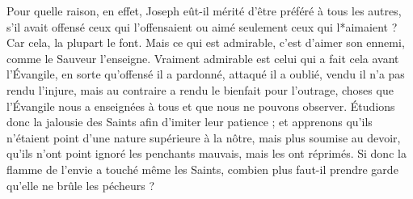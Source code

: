  Pour quelle raison, en effet, Joseph eût-il mérité d’être préféré à tous les autres, s’il avait offensé ceux qui l’offensaient ou aimé seulement ceux qui l*aimaient ? Car cela, la plupart le font. Mais ce qui est admirable, c’est d’aimer son ennemi, comme le Sauveur l’enseigne. Vraiment admirable est celui qui a fait cela avant l’Évangile, en sorte qu’offensé il a pardonné, attaqué il a oublié, vendu il n’a pas rendu l'injure, mais au contraire a rendu le bienfait pour l'outrage, choses que l’Évangile nous a enseignées à tous et que nous ne pouvons observer. Étudions donc la jalousie des Saints afin d’imiter leur patience ; et apprenons qu'ils n’étaient point d’une nature supérieure à la nôtre, mais plus soumise au devoir, qu’ils n’ont point ignoré les penchants mauvais, mais les ont réprimés. Si donc la flamme de l’envie a touché même les Saints, combien plus faut-il prendre garde qu’elle ne brûle les pécheurs ?
